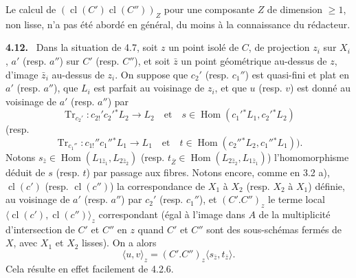 \documentclass[11pt]{article}
\newenvironment{statement}[1]{\par\medskip\noindent\textbf{#1.}\ }{\par\medskip}
\DeclareMathOperator{\Hom}{Hom}
\providecommand{\cl}{\operatorname{cl}}
\providecommand{\Tr}{\operatorname{Tr}}
\providecommand{\Tr}{\operatorname{Tr}}
\providecommand{\Tr}{\operatorname{Tr}}
\providecommand{\Hom}{\operatorname{Hom}}
\providecommand{\Tr}{\operatorname{Tr}}
\providecommand{\cl}{\operatorname{cl}}
\providecommand{\Hom}{\operatorname{Hom}}
\providecommand{\cl}{\operatorname{cl}}
\providecommand{\Tr}{\operatorname{Tr}}
\begin{document}
Le calcul de $(\cl(C')\cl(C''))_Z$ pour une composante $Z$ de dimension $\geq 1$, non lisse, n'a pas été abordé en général, du moins à la connaissance du rédacteur.

\begin{statement}{4.12}
Dans la situation de 4.7, soit $z$ un point isolé de $C$, de projection $z_i$ sur $X_i$, $a'$ (resp. $a''$) sur $C'$ (resp. $C''$), et soit $\bar z$ un point géométrique au-dessus de $z$, d'image $\bar z_i$ au-dessus de $z_i$. On suppose que $c_2'$ (resp. $c_1''$) est quasi-fini et plat en $a'$ (resp. $a''$), que $L_i$ est parfait au voisinage de $z_i$, et que $u$ (resp. $v$) est donné au voisinage de $a'$ (resp. $a''$) par
\[
\Tr_{c_2'}:c_{2!}'c_2'{}^*L_2\longrightarrow L_2
\quad\text{et}\quad
s\in\Hom(c_1'{}^*L_1,c_2'{}^*L_2)
\]
(resp.
\[
\Tr_{c_1''}:c_{1!}''c_1''{}^*L_1\longrightarrow L_1
\quad\text{et}\quad
t\in\Hom(c_2''{}^*L_2,c_1''{}^*L_1)).
\]
Notons $s_{\bar z}\in\Hom(L_{1\bar z_1},L_{2\bar z_2})$ (resp. $t_{\bar Z}\in\Hom(L_{2\bar z_2},L_{1\bar z_1})$) l'homomorphisme déduit de $s$ (resp. $t$) par passage aux fibres. Notons encore, comme en 3.2 a), $\cl(c')$ (resp. $\cl(c'')$) la correspondance de $X_1$ à $X_2$ (resp. $X_2$ à $X_1$) définie, au voisinage de $a'$ (resp. $a''$) par $c_2'$ (resp. $c_1''$), et $(C'.C'')_z$ le terme local $\langle\cl(c'),\cl(c'')\rangle_z$ correspondant (égal à l'image dans $A$ de la
multiplicité d'intersection de $C'$ et $C''$ en $z$ quand $C'$ et $C''$ sont des sous-schémas fermés de $X$, avec $X_1$ et $X_2$ lisses). On a alors
\begin{equation}
\tag{4.12.1}
\langle u,v\rangle_z=(C'.C'')_z\langle s_{\bar z},t_{\bar z}\rangle.
\end{equation}
Cela résulte en effet facilement de 4.2.6.
\end{statement}
\end{document}
